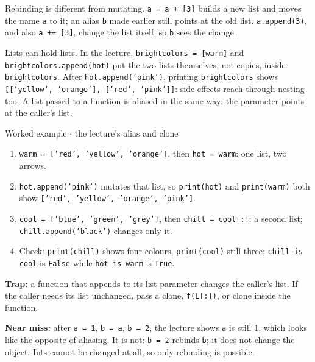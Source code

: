 \documentclass[11pt]{article}
\begin{document}
\begin{keepsection}
Rebinding is different from mutating. \texttt{a = a + [3]} builds a new list and moves the name \texttt{a} to it; an alias \texttt{b} made earlier still points at the old list. \texttt{a.append(3)}, and also \texttt{a += [3]}, change the list itself, so \texttt{b} sees the change.

Lists can hold lists. In the lecture, \texttt{brightcolors = [warm]} and \texttt{brightcolors.append(hot)} put the two lists themselves, not copies, inside \texttt{brightcolors}. After \texttt{hot.append('pink')}, printing \texttt{brightcolors} shows \texttt{[['yellow', 'orange'], ['red', 'pink']]}: side effects reach through nesting too. A list passed to a function is aliased in the same way: the parameter points at the caller’s list.

\begin{workedbox}{Worked example \ensuremath{\cdot} the lecture’s alias and clone}
\begin{enumerate}
\item \texttt{warm = ['red', 'yellow', 'orange']}, then \texttt{hot = warm}: one list, two arrows.
\item \texttt{hot.append('pink')} mutates that list, so \texttt{print(hot)} and \texttt{print(warm)} both show \texttt{['red', 'yellow', 'orange', 'pink']}.
\item \texttt{cool = ['blue', 'green', 'grey']}, then \texttt{chill = cool[:]}: a second list; \texttt{chill.append('black')} changes only it.
\item Check: \texttt{print(chill)} shows four colours, \texttt{print(cool)} still three; \texttt{chill is cool} is \texttt{False} while \texttt{hot is warm} is \texttt{True}.
\end{enumerate}
\end{workedbox}

\begin{notebox}\textbf{Trap:} a function that appends to its list parameter changes the caller’s list. If the caller needs its list unchanged, pass a clone, \texttt{f(L[:])}, or clone inside the function.\end{notebox}

\begin{notebox}\textbf{Near miss:} after \texttt{a = 1}, \texttt{b = a}, \texttt{b = 2}, the lecture shows \texttt{a} is still 1, which looks like the opposite of aliasing. It is not: \texttt{b = 2} rebinds \texttt{b}; it does not change the object. Ints cannot be changed at all, so only rebinding is possible.\end{notebox}


\end{keepsection}
\end{document}
